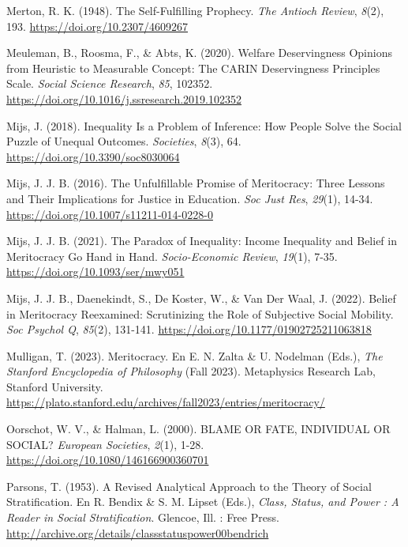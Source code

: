 \documentclass[
  spanish,
  a4paper,
  oneside]{scrbook}
\newlength{\cslhangindent}
\newenvironment{CSLReferences}[2] %
 {\begin{list}{}{%
  \setlength{\itemindent}{0pt}
  \setlength{\leftmargin}{0pt}
  \setlength{\parsep}{0pt}
  \ifodd #1
   \setlength{\leftmargin}{\cslhangindent}
   \setlength{\itemindent}{-1\cslhangindent}
  \fi
  \setlength{\itemsep}{#2\baselineskip}}}
 {\end{list}}
\begin{document}
\begin{CSLReferences}{1}{0}
Merton, R. K. (1948). The {Self-Fulfilling Prophecy}. \emph{The Antioch
Review}, \emph{8}(2), 193. \url{https://doi.org/10.2307/4609267}

Meuleman, B., Roosma, F., \& Abts, K. (2020). Welfare Deservingness
Opinions from Heuristic to Measurable Concept: {The CARIN} Deservingness
Principles Scale. \emph{Social Science Research}, \emph{85}, 102352.
\url{https://doi.org/10.1016/j.ssresearch.2019.102352}

Mijs, J. (2018). Inequality {Is} a {Problem} of {Inference}: {How People
Solve} the {Social Puzzle} of {Unequal Outcomes}. \emph{Societies},
\emph{8}(3), 64. \url{https://doi.org/10.3390/soc8030064}

Mijs, J. J. B. (2016). The {Unfulfillable Promise} of {Meritocracy}:
{Three Lessons} and {Their Implications} for {Justice} in {Education}.
\emph{Soc Just Res}, \emph{29}(1), 14-34.
\url{https://doi.org/10.1007/s11211-014-0228-0}

Mijs, J. J. B. (2021). The Paradox of Inequality: Income Inequality and
Belief in Meritocracy Go Hand in Hand. \emph{Socio-Economic Review},
\emph{19}(1), 7-35. \url{https://doi.org/10.1093/ser/mwy051}

Mijs, J. J. B., Daenekindt, S., De Koster, W., \& Van Der Waal, J.
(2022). Belief in {Meritocracy Reexamined}: {Scrutinizing} the {Role} of
{Subjective Social Mobility}. \emph{Soc Psychol Q}, \emph{85}(2),
131-141. \url{https://doi.org/10.1177/01902725211063818}

Mulligan, T. (2023). Meritocracy. En E. N. Zalta \& U. Nodelman (Eds.),
\emph{The {Stanford Encyclopedia} of {Philosophy}} (Fall 2023).
Metaphysics Research Lab, Stanford University.
\url{https://plato.stanford.edu/archives/fall2023/entries/meritocracy/}

Oorschot, W. V., \& Halman, L. (2000). {BLAME OR FATE}, {INDIVIDUAL OR
SOCIAL}? \emph{European Societies}, \emph{2}(1), 1-28.
\url{https://doi.org/10.1080/146166900360701}

Parsons, T. (1953). A {Revised Analytical Approach} to the {Theory} of
{Social Stratification}. En R. Bendix \& S. M. Lipset (Eds.),
\emph{Class, Status, and Power : A Reader in Social Stratification}.
Glencoe, Ill. : Free Press.
\url{http://archive.org/details/classstatuspower00bendrich}


\end{CSLReferences}
\end{document}
